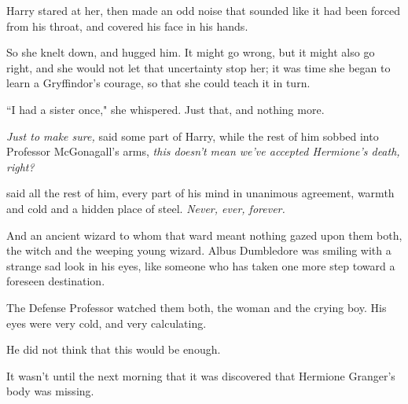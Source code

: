 Harry stared at her, then made an odd noise that sounded like it had been forced from his throat, and covered his face in his hands.

So she knelt down, and hugged him. It might go wrong, but it might also go right, and she would not let that uncertainty stop her; it was time she began to learn a Gryffindor's courage, so that she could teach it in turn.

``I had a sister once," she whispered. Just that, and nothing more.

\later

\emph{Just to make sure,} said some part of Harry, while the rest of him sobbed into Professor McGonagall's arms, \emph{this doesn't mean we've accepted Hermione's death, right?}

\emph{} said all the rest of him, every part of his mind in unanimous agreement, warmth and cold and a hidden place of steel. \emph{Never, ever, forever.}

\later

And an ancient wizard to whom that ward meant nothing gazed upon them both, the witch and the weeping young wizard. Albus Dumbledore was smiling with a strange sad look in his eyes, like someone who has taken one more step toward a foreseen destination.

\later

The Defense Professor watched them both, the woman and the crying boy. His eyes were very cold, and very calculating.

He did not think that this would be enough.

\later

It wasn't until the next morning that it was discovered that Hermione Granger's body was missing.


